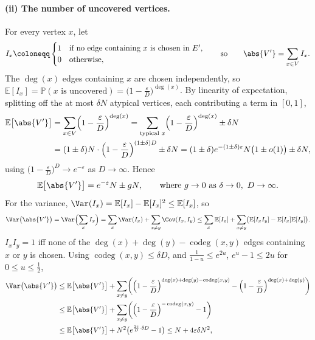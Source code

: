 \paragraph{(ii) The number of uncovered vertices.} For every vertex \(x\), let
\[
    I_{x} \coloneqq
    \begin{cases}
        1 & \text{if no edge containing } x \text{ is chosen in } E', \\
        0 & \text{otherwise,}
    \end{cases}
    \qquad\text{so}\qquad
    \abs{V'} = \sum_{x \in V} I_{x} .
\]
The \(\deg(x)\) edges containing \(x\) are chosen independently, so \(\mathbb{E}[I_{x}] = \mathbb{P}(x \text{ is uncovered}) = \bigl( 1 - \frac{\varepsilon}{D} \bigr)^{\deg(x)}\). By linearity of expectation, splitting off the at most \(\delta N\) atypical vertices, each contributing a term in \([0, 1]\),
\[
    \begin{aligned}
        \mathbb{E}\bigl[ \abs{V'} \bigr]
        &= \sum_{x \in V} \Bigl( 1 - \frac{\varepsilon}{D} \Bigr)^{\deg(x)}
        = \sum_{\text{typical } x} \Bigl( 1 - \frac{\varepsilon}{D} \Bigr)^{\deg(x)} \pm \delta N \\
        &= (1 \pm \delta) N \cdot \Bigl( 1 - \frac{\varepsilon}{D} \Bigr)^{(1 \pm \delta) D} \pm \delta N
        = (1 \pm \delta) e^{-(1 \pm \delta)\varepsilon} N \bigl( 1 \pm o(1) \bigr) \pm \delta N ,
    \end{aligned}
\]
using \(\bigl( 1 - \frac{\varepsilon}{D} \bigr)^{D} \to e^{-\varepsilon}\) as \(D \to \infty\). Hence
\begin{equation}\label{eq:nibble-EV}
    \mathbb{E}\bigl[ \abs{V'} \bigr] = e^{-\varepsilon} N \pm g N,
    \qquad\text{where } g \to 0 \text{ as } \delta \to 0,\ D \to \infty .
\end{equation}
For the variance, \(\Var(I_{x}) = \mathbb{E}[I_{x}] - \mathbb{E}[I_{x}]^{2} \le \mathbb{E}[I_{x}]\), so
\[
    \Var\bigl( \abs{V'} \bigr) = \Var\Bigl( \sum_{x} I_{x} \Bigr)
    = \sum_{x} \Var(I_{x}) + \sum_{x \ne y} \Cov(I_{x}, I_{y})
    \le \sum_{x} \mathbb{E}[I_{x}] + \sum_{x \ne y} \bigl( \mathbb{E}[I_{x} I_{y}] - \mathbb{E}[I_{x}] \mathbb{E}[I_{y}] \bigr).
\]
\(I_{x} I_{y} = 1\) iff none of the \(\deg(x) + \deg(y) - \operatorname{codeg}(x,y)\) edges containing \(x\) or \(y\) is chosen. Using \(\operatorname{codeg}(x,y) \le \delta D\), and \(\frac{1}{1 - u} \le e^{2u}\), \(e^{u} - 1 \le 2u\) for \(0 \le u \le \frac{1}{2}\),
\[
    \begin{aligned}
        \Var\bigl( \abs{V'} \bigr)
        &\le \mathbb{E}\bigl[ \abs{V'} \bigr] + \sum_{x \ne y} \biggl( \Bigl( 1 - \frac{\varepsilon}{D} \Bigr)^{\deg(x) + \deg(y) - \operatorname{codeg}(x,y)} - \Bigl( 1 - \frac{\varepsilon}{D} \Bigr)^{\deg(x) + \deg(y)} \biggr) \\
        &\le \mathbb{E}\bigl[ \abs{V'} \bigr] + \sum_{x \ne y} \biggl( \Bigl( 1 - \frac{\varepsilon}{D} \Bigr)^{-\operatorname{codeg}(x,y)} - 1 \biggr) \\
        &\le \mathbb{E}\bigl[ \abs{V'} \bigr] + N^{2} \bigl( e^{\frac{2\varepsilon}{D} \cdot \delta D} - 1 \bigr)
        \le N + 4 \varepsilon \delta N^{2} ,
    \end{aligned}
\]
